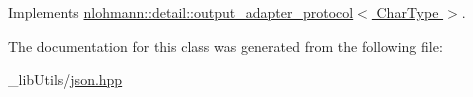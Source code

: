 Implements \hyperlink{structnlohmann_1_1detail_1_1output__adapter__protocol_a2f410a164e0eda17cf6561114b0eee4a}{nlohmann\+::detail\+::output\+\_\+adapter\+\_\+protocol$<$ Char\+Type $>$}.



The documentation for this class was generated from the following file\+:\begin{DoxyCompactItemize}
\item 
\+\_\+lib\+Utils/\hyperlink{json_8hpp}{json.\+hpp}\end{DoxyCompactItemize}
